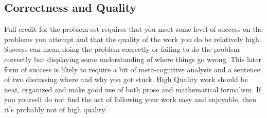 \documentclass[nobib]{tufte-handout}
\begin{document}
\subsection*{Correctness and Quality}

Full credit for the problem set requires that you meet some level of success on the problems you attempt and that the quality of the work you do be relatively high. Success can mean doing the problem correctly or failing to do the problem correctly but displaying some understanding of where things go wrong.  This later form of success is likely to require a bit of meta-cognitive analysis and a sentence of two discussing where and why you got stuck. High Quality work should be neat, organized and make good use of both prose and mathematical formalism.  If you yourself do not find the act of following your work easy and enjoyable, then it's probably not of high quality.
\end{document}
